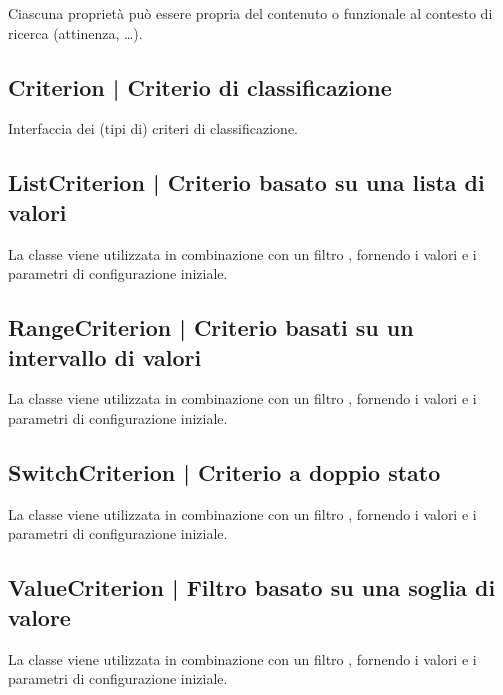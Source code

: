 \documentclass[10pt,a4paper,headinclude,footinclude,hidelinks]{scrreprt} %
\begin{document}
	Ciascuna proprietà può essere propria del contenuto o funzionale al contesto di ricerca (attinenza, \ldots).

	\subsection[Criterion]{Criterion | Criterio di classificazione}
	\label{sec:stage:design:sistema:model.criteria:criteria}
	Interfaccia dei (tipi di) criteri di classificazione.

	\subsection[ListCriterion]{ListCriterion | Criterio basato su una lista di valori}
	\label{sec:stage:design:sistema:model.criteria:list-criterion}
	La classe \textit{} viene utilizzata in combinazione con un filtro \textit{}, fornendo i valori e i parametri di configurazione iniziale.

	\subsection[RangeCriterion]{RangeCriterion | Criterio basati su un intervallo di valori}
	\label{sec:stage:design:sistema:model.criteria:range-criterion}
	La classe \textit{} viene utilizzata in combinazione con un filtro \textit{}, fornendo i valori e i parametri di configurazione iniziale.

	\subsection[SwitchCriterion]{SwitchCriterion | Criterio a doppio stato}
	\label{sec:stage:design:sistema:model.criteria:switch-criterion}
	La classe \textit{} viene utilizzata in combinazione con un filtro \textit{}, fornendo i valori e i parametri di configurazione iniziale.

	\subsection[ValueCriterion]{ValueCriterion | Filtro basato su una soglia di valore}
	\label{sec:stage:design:sistema:model.criteria:value-criterion}
	La classe \textit{} viene utilizzata in combinazione con un filtro \textit{}, fornendo i valori e i parametri di configurazione iniziale.
\end{document}
